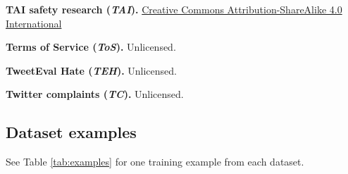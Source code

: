 \documentclass{article}
\begin{document}
\textbf{TAI safety research (\textit{TAI}).} \href{https://creativecommons.org/licenses/by-sa/4.0/legalcode}{Creative Commons Attribution-ShareAlike 4.0 International}

\textbf{Terms of Service (\textit{ToS}).} Unlicensed.


\textbf{TweetEval Hate (\textit{TEH}).} Unlicensed.


\textbf{Twitter complaints (\textit{TC}).} Unlicensed.


\subsection{Dataset examples}

See Table \ref{tab:examples} for one training example from each dataset.

\begin{table}[ht]


\end{table}
\end{document}
